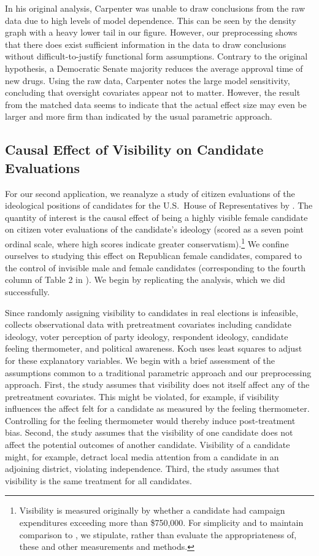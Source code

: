 \documentclass[11pt,titlepage]{article}
\begin{document}
In his original analysis, Carpenter was unable to draw conclusions
from the raw data due to high levels of model dependence. This can be
seen by the density graph with a heavy lower tail in our figure.
However, our preprocessing shows that there does exist sufficient
information in the data to draw conclusions without
difficult-to-justify functional form assumptions.  Contrary to the
original hypothesis, a Democratic Senate majority reduces the average
approval time of new drugs.  Using the raw data, Carpenter notes the
large model sensitivity, concluding that oversight covariates appear
not to matter.  However, the result from the matched data seems to
indicate that the actual effect size may even be larger and more firm
than indicated by the usual parametric approach.

\subsection{Causal Effect of Visibility on Candidate
  Evaluations}

For our second application, we reanalyze a study of citizen
evaluations of the ideological positions of candidates for the U.S.\
House of Representatives by \citet{Koch02}.  The quantity of interest
is the causal effect of being a highly visible female candidate on
citizen voter evaluations of the candidate's ideology (scored as a
seven point ordinal scale, where high scores indicate greater
conservatism).\footnote{Visibility is measured originally by whether a
  candidate had campaign expenditures exceeding more than \$750,000.
  For simplicity and to maintain comparison to \citet{Koch02}, we
  stipulate, rather than evaluate the appropriateness of, these and
  other measurements and methods.}  We confine ourselves to studying
this effect on Republican female candidates, compared to the control
of invisible male and female candidates (corresponding to the fourth
column of Table 2 in \citet[p.  459]{Koch02}).  We begin by
replicating the analysis, which we did successfully.

Since randomly assigning visibility to candidates in real elections is
infeasible, \citet{Koch02} collects observational data with
pretreatment covariates including candidate ideology, voter perception
of party ideology, respondent ideology, candidate feeling thermometer,
and political awareness.  Koch uses least squares to adjust for these
explanatory variables.  We begin with a brief assessment of the
assumptions common to a traditional parametric approach and our
preprocessing approach.  First, the study assumes that visibility does
not itself affect any of the pretreatment covariates.  This might be
violated, for example, if visibility influences the affect felt for a
candidate as measured by the feeling thermometer.  Controlling for the
feeling thermometer would thereby induce post-treatment bias.  Second,
the study assumes that the visibility of one candidate does not affect
the potential outcomes of another candidate.  Visibility of a
candidate might, for example, detract local media attention from a
candidate in an adjoining district, violating independence.  Third,
the study assumes that visibility is the same treatment for all
candidates.
\end{document}
